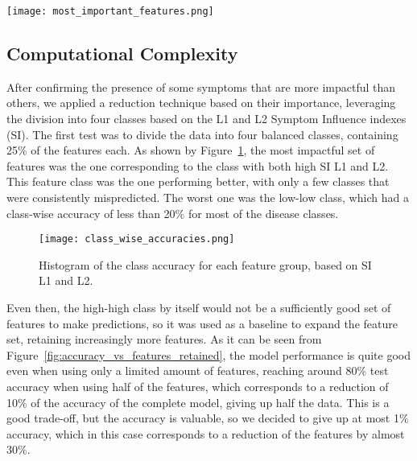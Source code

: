 \begin{figure*}[htbp]
	\centering
	\texttt{[image: most\_important\_features.png]}
	\caption{10 most impactful features}\label{fig:most_important_features}
\end{figure*}
\noindent

\subsection{Computational Complexity}
After confirming the presence of some symptoms that are more impactful than others,
we applied a reduction technique based on their importance, leveraging the division
into four classes based on the L1 and L2 Symptom Influence indexes (SI).
The first test was to divide the data into four balanced classes, containing 25\% of the features each.
As shown by Figure~\ref{fig:class_wise_accuracies}, the most impactful set of
features was the one corresponding to the class with both high SI L1 and L2.
This feature class was the one performing better, with only a few classes that were consistently mispredicted.
The worst one was the low-low class, which had a class-wise accuracy of less than 20\% for most of the disease classes.

\begin{figure}[H]
	\centering
	\texttt{[image: class\_wise\_accuracies.png]}
	\caption{Histogram of the class accuracy for each feature group, based on SI L1 and L2.}\label{fig:class_wise_accuracies}
\end{figure}

\noindent
Even then, the high-high class by itself would not be a sufficiently good set of features to make predictions,
so it was used as a baseline to expand the feature set, retaining increasingly more features.
As it can be seen from Figure~\ref{fig:accuracy_vs_features_retained}, the model performance is quite good even when using only
a limited amount of features, reaching around 80\% test accuracy when using half of the features, which corresponds to a
reduction of 10\% of the accuracy of the complete model, giving up half the data.
This is a good trade-off, but the accuracy is valuable, so we decided to give up at most 1\% accuracy,
which in this case corresponds to a reduction of the features by almost 30\%.

